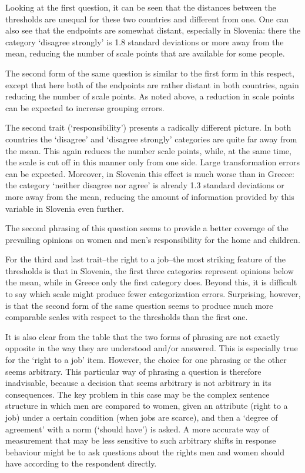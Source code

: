 \documentclass[a4paper,12pt]{article}
\begin{document}
Looking at the first question, it can be seen that the distances between the thresholds are unequal for these two countries and different from one. One can also see that the endpoints are somewhat distant, especially in Slovenia: there the category `disagree strongly' is 1.8 standard deviations or more away from the mean, reducing the number of scale points that are available for some people. 

The second form of the same question is similar to the first form in this respect, except that here both of the endpoints are rather distant in both countries, again reducing the number of scale points. As noted above, a reduction in scale points can be expected to increase grouping errors.

The second trait (`responsibility') presents a radically different picture. In both countries the `disagree' and `disagree strongly' categories are quite far away from the mean. This again reduces the number scale points, while, at the same time, the scale is cut off in this manner only from one side. Large transformation errors can be expected. Moreover, in Slovenia this effect is much worse than in Greece: the category `neither disagree nor agree' is already 1.3 standard deviations or more away from the mean,  reducing the amount of information provided by this variable in Slovenia even further.

The second phrasing of this question seems to provide a better coverage of the prevailing opinions on women and men's responsibility for the home and children.

For the third and last trait--the right to a job--the most striking feature of the thresholds is that in Slovenia, the first three categories represent opinions below the mean, while in Greece only the first category does. Beyond this, it is difficult to say which scale might produce fewer categorization errors. Surprising, however, is that the second form of the same question seems to produce much more comparable scales with respect to the thresholds than the first one.

It is also clear from the table that the two forms of phrasing are not exactly opposite in the way they are understood and/or answered. This is especially true for the `right to a job' item. However, the choice for one phrasing or the other seems arbitrary. This particular way of phrasing a question is therefore inadvisable, because a decision  that seems arbitrary is not arbitrary in its consequences. The key problem in this case may be the complex sentence structure in which men are compared to women, given an attribute (right to a job) under a certain condition (when jobs are scarce), and then a `degree of agreement' with a norm (`should have') is asked. A more accurate way of measurement that may be less sensitive to such arbitrary shifts in response behaviour might be to ask questions about the rights men and women should have according to the respondent directly.
\end{document}
